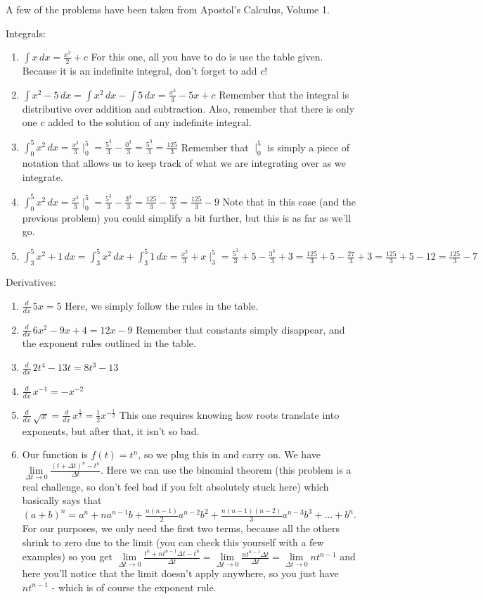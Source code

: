 A few of the problems have been taken from Apostol's Calculus, Volume 1.

Integrals: 
\begin{enumerate}
\item $\int x \, dx = \frac{x^2}{2}+c$ For this one, all you have to do is use the table given. 
Because it is an indefinite integral, don't forget to add $c$!
\item $\int x^2 - 5 \,dx = \int x^2 \, dx - \int 5 \, dx = \frac{x^3}{3}-5x + c$ Remember that the integral is distributive over addition and subtraction. 
Also, remember that there is only one $c$ added to the solution of any indefinite integral.
\item $\int^5_0 x^2 \, dx = \frac{x^3}{3}\mid^5_0 = \frac{5^3}{3}-\frac{0^3}{3}=\frac{5^3}{3}=\frac{125}{3}$ Remember that $\mid^5_0$ is simply a piece of notation that allows us to keep track of what we are integrating over as we integrate.
\item $\int^5_0 x^2 \, dx = \frac{x^3}{3}\mid^5_0 = \frac{5^3}{3}-\frac{3^3}{3} = \frac{125}{3} - \frac{27}{3} = \frac{125}{3}-9$ Note that in this case (and the previous problem) you could simplify a bit further, but this is as far as we'll go.
\item $\int^5_3 x^2 + 1\, dx = \int^5_3 x^2 \, dx + \int^5_3 1 \, dx = \frac{x^3}{3}+x\mid^5_3 = \frac{5^3}{3}+5 - \frac{3^3}{3}+3 = \frac{125}{3}+5 - \frac{27}{3}+3 = \frac{125}{3}+5 - 12 = \frac{125}{3}-7$
\end{enumerate}

Derivatives:
\begin{enumerate}
\item $\frac{d}{dx} \, 5x = 5$ Here, we simply follow the rules in the table.
\item $\frac{d}{dx} \, 6x^2 - 9x + 4 = 12x - 9$ Remember that constants simply disappear, and the exponent rules outlined in the table.
\item $\frac{d}{dx} \, 2t^4 - 13t = 8t^3 - 13$
\item $\frac{d}{dx}\, x^{-1} = -x^{-2}$ 
\item $\frac{d}{dx}\, \sqrt{x} = \frac{d}{dx}\, x^{\frac{1}{2}} = \frac{1}{2}x^{-\frac{1}{2}}$ This one requires knowing how roots translate into exponents, but after that, it isn't so bad.
\item Our function is $f(t) = t^n$, so we plug this in and carry on. We have $\lim\limits_{\Delta t\rightarrow 0}\frac{(t+\Delta t)^n-t^n}{\Delta t}$. Here we can use the binomial theorem (this problem is a real challenge, so don't feel bad if you felt absolutely stuck here) which basically says that $(a+b)^n = a^n+na^{n-1}b+\frac{n(n-1)}{2}a^{n-2}b^2+\frac{n(n-1)(n-2)}{3}a^{n-3}b^3+...+b^n$. For our purposes, we only need the first two terms, because all the others shrink to zero due to the limit (you can check this yourself with a few examples) so you get $\lim\limits_{\Delta t\rightarrow 0}\frac{t^n+nt^{n-1}\Delta t-t^n}{\Delta t}=\lim\limits_{\Delta t\rightarrow 0}\frac{nt^{n-1}\Delta t}{\Delta t}=\lim\limits_{\Delta t\rightarrow 0}nt^{n-1}$ and here you'll notice that the limit doesn't apply anywhere, so you just have $nt^{n-1}$ - which is of course the exponent rule.
\end{enumerate}

